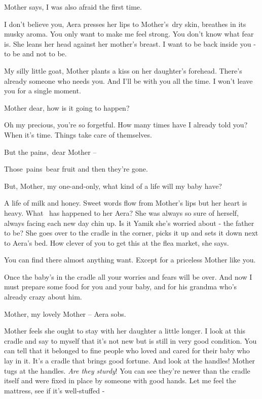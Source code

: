 \documentclass[letterpaper]{article}
\begin{document}
Mother says, {\textquotedbl}I was also afraid the{ }first time.{\textquotedbl} 

{\textquotedbl}I don't believe you,{\textquotedbl} Aera presses her lips{ }to Mother's~dry skin, breathes
in its musky aroma. {\textquotedbl}You only want to make me feel strong. You don't know what fear is.{\textquotedbl}
She leans her head against her mother's breast. {\textquotedbl}I want to be back inside you - to be and not to
be.{\textquotedbl} 

{\textquotedbl}My silly little goat,{\textquotedbl} Mother plants a kiss on her daughter's forehead.
{\textquotedbl}There's already someone who needs you. And I'll be with you all the time. I won't leave you for a single
moment.{\textquotedbl} 

{\textquotedbl}Mother dear, how is it going to happen?{\textquotedbl} 

{\textquotedbl}Oh my precious, you're so forgetful. How many times have I already told you? When it's time. Things take
care of themselves.{\textquotedbl} 

{\textquotedbl}But the pains,~dear Mother -- {\textquotedbl} 

{\textquotedbl}Those~pains~bear fruit and then they're gone.{\textquotedbl} 

{\textquotedbl}But, Mother, my one-and-only, what kind of a life will my baby have?{\textquotedbl} 

{\textquotedbl}A life of milk and honey.{\textquotedbl} Sweet words flow from Mother's lips but her heart is heavy. What
\ has happened to her Aera? She was always so sure of herself, always facing each new day chin up. Is it Yamik she's
worried about - the father to be? She goes over to the cradle in the corner, picks it up and sets it down next to
Aera's bed. {\textquotedbl}How clever of you to get this at the flea market,{\textquotedbl} she says. 

{\textquotedbl}You can find there almost anything want. Except for a priceless Mother like you.{\textquotedbl} 

{\textquotedbl}Once the baby's in the cradle all your worries and fears will be over. And now I must prepare some food
for you and your baby, and for his grandma who's already crazy about him.{\textquotedbl} 

{\textquotedbl}Mother, my lovely Mother --{\textquotedbl} Aera sobs. ~

Mother feels she ought to stay with her daughter a little longer. {\textquotedbl}I look at this cradle and say to myself
that it's not new but is{ }still in very good condition. You can tell that it belonged to fine people
who loved and cared for their baby who lay in it. It's a cradle that brings good fortune. And look at the
handles!{\textquotedbl} Mother tugs at the handles. {\textquotedbl}\textit{Are they sturdy}! You can see they're newer
than the cradle itself and were fixed in place by someone with good hands. Let me feel the mattress, see if it's
well-stuffed -{\textquotedbl} 
\end{document}

